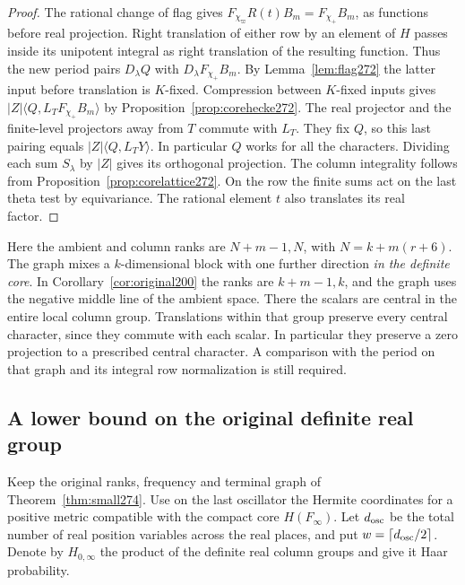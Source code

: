 \documentclass[a4paper,11pt]{article}
\theoremstyle{definition}
\theoremstyle{remark}
\numberwithin{equation}{section}
\begin{document}
\begin{proof}
The rational change of flag gives
\(F_{\chi_\varpi}R(t)B_m=F_{\chi_+}B_m\), as functions before
real projection. Right translation of either row by an element
of \(H\) passes inside its unipotent integral as right translation
of the resulting function. Thus the new period pairs
\(D_\lambda Q\) with \(D_\lambda F_{\chi_+}B_m\).
By Lemma~\ref{lem:flag272} the latter input before translation
is \(K\)-fixed. Compression between \(K\)-fixed inputs gives
\(|Z|\langle Q,L_T F_{\chi_+}B_m\rangle\) by
Proposition~\ref{prop:corehecke272}. The real projector and
the finite-level projectors away from \(T\) commute with \(L_T\).
They fix \(Q\), so this last pairing equals
\(|Z|\langle Q,L_TY\rangle\). In particular \(Q\) works for
all the characters. Dividing each sum \(S_\lambda\) by \(|Z|\)
gives its orthogonal projection. The column integrality follows
from Proposition~\ref{prop:corelattice272}. On the row the
finite sums act on the last theta test by equivariance. The
rational element \(t\) also translates its real factor.
\end{proof}

Here the ambient and column ranks are \(N+m-1,N\), with
\(N=k+m(r+6)\). The graph mixes a \(k\)-dimensional block
with one further direction \emph{in the definite core}. In
Corollary~\ref{cor:original200} the ranks are \(k+m-1,k\),
and the graph uses the negative middle line of the ambient
space. There the scalars are central in the entire local
column group. Translations within that group preserve every
central character, since they commute with each scalar.
In particular they preserve a zero projection to a prescribed
central character. A comparison with the period on that graph
and its integral row normalization is still required.

\subsection{A lower bound on the original definite real group}\label{nav:VIII-45}
Keep the original ranks, frequency and terminal graph of
Theorem~\ref{thm:small274}. Use on the last oscillator the
Hermite coordinates for a positive metric compatible with
the compact core \(H(F_\infty)\). Let \(d_{\rm osc}\) be
the total number of real position variables across the real
places, and put \(w=\lceil d_{\rm osc}/2\rceil\). Denote
by \(H_{0,\infty}\) the product of the definite real column
groups and give it Haar probability.
\end{document}
